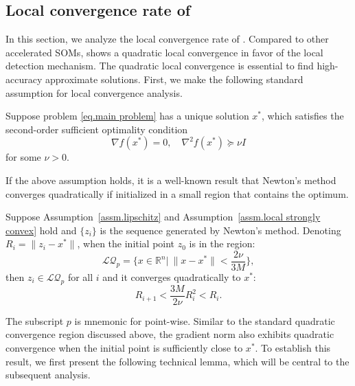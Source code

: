 \documentclass{article}
\begin{document}
\subsection{Local convergence rate of }
\label{sec.local}
In this section, we analyze the local convergence rate of . Compared to other accelerated SOMs,  shows a quadratic local convergence in favor of the local detection mechanism. The quadratic local convergence is essential to find high-accuracy approximate solutions. First, we make the following standard assumption for local convergence analysis.
\begin{assumption}
    \label{assm.local strongly convex}
    Suppose problem \eqref{eq.main problem} has a unique solution $x^*$, which satisfies the second-order sufficient optimality condition
    \begin{equation}
        \label{eq.second-order suff cond}
        \nabla f(x^*)=0, \quad \nabla^2 f(x^*)\succeq \nu I
    \end{equation}
    for some $\nu >0$.
\end{assumption}
If the above assumption holds, it is a well-known result that Newton's method converges quadratically if initialized in a small region that contains the optimum.
\begin{lemma}
    \label{lem.quadratic point}
    Suppose Assumption~\ref{assm.lipschitz} and Assumption~\ref{assm.local strongly convex} hold and $\{z_i\}$ is the sequence generated by Newton's method. Denoting $R_i = \|z_i-x^*\|$, when the initial point $z_0$ is in the region:
    \begin{equation}
        \label{eq.local quadratic region}
        \mathcal{LQ}_p = \{x\in\mathbb{R}^n| \ \|x-x^*\| < \frac{2\nu}{3M}\},
    \end{equation}
    then $z_i \in \mathcal{LQ}_p$ for all $i$ and it converges quadratically to $x^*$:
    \begin{equation}
        \label{eq.quadratic convergence}
        R_{i+1} < \frac{3M}{2\nu}R_i^2<R_i.
    \end{equation}
\end{lemma}
The subscript $p$ is mnemonic for point-wise. Similar to the standard quadratic convergence region discussed above, the gradient norm also exhibits quadratic convergence when the initial point is sufficiently close to $x^*$. To establish this result, we first present the following technical lemma, which will be central to the subsequent analysis.
\end{document}
